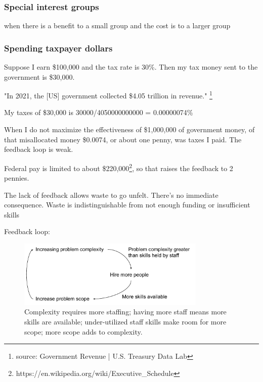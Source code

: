 \subsubsection{Special interest groups}

when there is a benefit to a small group and the cost is to a larger group

\subsubsection{Spending taxpayer dollars}

Suppose I earn \$100,000 and the tax rate is 30\%. Then my tax money sent to the government is \$30,000.

"In 2021, the [US] government collected \$4.05 trillion in revenue."
\footnote{source: Government Revenue | U.S. Treasury Data Lab}

My taxes of \$30,000 is
30000/4050000000000 = 0.00000074\%

When I do not maximize the effectiveness of \$1,000,000 of government money, of that misallocated money \$0.0074, or about one penny, was taxes I paid. The feedback loop is weak.

Federal pay is limited to about \$220,000\footnote{https://en.wikipedia.org/wiki/Executive\_Schedule}, so that raises the feedback to 2 pennies.

The lack of feedback allows waste to go unfelt. There's no immediate consequence.
Waste is indistinguishable from not enough funding or insufficient skills 




Feedback loop:
\begin{center}
\begin{figure}[ht]
    \centering
    \includegraphics[width=0.8\textwidth]{images/feedback_loop_complexity_and_staffing}
    \caption{Complexity requires more staffing; having more staff means more skills are available; under-utilized staff skills make room for more scope; more scope adds to complexity.}
    \label{fig:complexity_and_staff_growth}
\end{figure}
\end{center}

